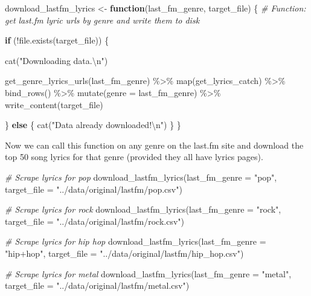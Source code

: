 \documentclass[
]{article}
\newenvironment{Shaded}{\begin{snugshade}}{\end{snugshade}}
\newcommand{\AttributeTok}[1]{\textcolor[rgb]{0.77,0.63,0.00}{#1}}
\newcommand{\CommentTok}[1]{\textcolor[rgb]{0.56,0.35,0.01}{\textit{#1}}}
\newcommand{\ControlFlowTok}[1]{\textcolor[rgb]{0.13,0.29,0.53}{\textbf{#1}}}
\newcommand{\FunctionTok}[1]{\textcolor[rgb]{0.00,0.00,0.00}{#1}}
\newcommand{\NormalTok}[1]{#1}
\newcommand{\OtherTok}[1]{\textcolor[rgb]{0.56,0.35,0.01}{#1}}
\newcommand{\SpecialCharTok}[1]{\textcolor[rgb]{0.00,0.00,0.00}{#1}}
\newcommand{\StringTok}[1]{\textcolor[rgb]{0.31,0.60,0.02}{#1}}
\begin{document}
\begin{Shaded}
\begin{Highlighting}[]
\NormalTok{download\_lastfm\_lyrics }\OtherTok{\textless{}{-}} \ControlFlowTok{function}\NormalTok{(last\_fm\_genre, target\_file) \{}
    \CommentTok{\# Function: get last.fm lyric urls by genre and write them to disk}

    \ControlFlowTok{if}\NormalTok{ (}\SpecialCharTok{!}\FunctionTok{file.exists}\NormalTok{(target\_file)) \{}

        \FunctionTok{cat}\NormalTok{(}\StringTok{"Downloading data.}\SpecialCharTok{\textbackslash{}n}\StringTok{"}\NormalTok{)}

        \FunctionTok{get\_genre\_lyrics\_urls}\NormalTok{(last\_fm\_genre) }\SpecialCharTok{\%\textgreater{}\%}
            \FunctionTok{map}\NormalTok{(get\_lyrics\_catch) }\SpecialCharTok{\%\textgreater{}\%}
            \FunctionTok{bind\_rows}\NormalTok{() }\SpecialCharTok{\%\textgreater{}\%}
            \FunctionTok{mutate}\NormalTok{(}\AttributeTok{genre =}\NormalTok{ last\_fm\_genre) }\SpecialCharTok{\%\textgreater{}\%}
            \FunctionTok{write\_content}\NormalTok{(target\_file)}

\NormalTok{    \} }\ControlFlowTok{else}\NormalTok{ \{}
        \FunctionTok{cat}\NormalTok{(}\StringTok{"Data already downloaded!}\SpecialCharTok{\textbackslash{}n}\StringTok{"}\NormalTok{)}
\NormalTok{    \}}
\NormalTok{\}}
\end{Highlighting}
\end{Shaded}

Now we can call this function on any genre on the last.fm site and download the top 50 song lyrics for that genre (provided they all have lyrics pages).

\begin{Shaded}
\begin{Highlighting}[]
\CommentTok{\# Scrape lyrics for \textquotesingle{}pop\textquotesingle{}}
\FunctionTok{download\_lastfm\_lyrics}\NormalTok{(}\AttributeTok{last\_fm\_genre =} \StringTok{"pop"}\NormalTok{, }\AttributeTok{target\_file =} \StringTok{"../data/original/lastfm/pop.csv"}\NormalTok{)}

\CommentTok{\# Scrape lyrics for \textquotesingle{}rock\textquotesingle{}}
\FunctionTok{download\_lastfm\_lyrics}\NormalTok{(}\AttributeTok{last\_fm\_genre =} \StringTok{"rock"}\NormalTok{, }\AttributeTok{target\_file =} \StringTok{"../data/original/lastfm/rock.csv"}\NormalTok{)}

\CommentTok{\# Scrape lyrics for \textquotesingle{}hip hop\textquotesingle{}}
\FunctionTok{download\_lastfm\_lyrics}\NormalTok{(}\AttributeTok{last\_fm\_genre =} \StringTok{"hip+hop"}\NormalTok{, }\AttributeTok{target\_file =} \StringTok{"../data/original/lastfm/hip\_hop.csv"}\NormalTok{)}

\CommentTok{\# Scrape lyrics for \textquotesingle{}metal\textquotesingle{}}
\FunctionTok{download\_lastfm\_lyrics}\NormalTok{(}\AttributeTok{last\_fm\_genre =} \StringTok{"metal"}\NormalTok{, }\AttributeTok{target\_file =} \StringTok{"../data/original/lastfm/metal.csv"}\NormalTok{)}
\end{Highlighting}
\end{Shaded}
\end{document}
